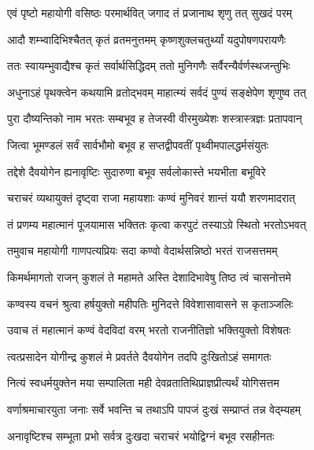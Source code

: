 
\twolineshloka
{एवं पृष्टो महायोगी वसिष्ठः परमार्थवित्}
{जगाद तं प्रजानाथ श‍ृणु तत् सुखदं परम्} %


\twolineshloka
{आदौ शम्भ्वादिभिश्चैतत् कृतं व्रतमनुत्तमम्}
{कृष्णशुक्लचतुर्थ्यां यदुपोषणपरायणैः} %

\twolineshloka
{ततः स्वायम्भुवाद्यैश्च कृतं सर्वार्थसिद्धिदम्}
{ततो मुनिगणैः सर्वैरन्यैर्वर्णस्थजन्तुभिः} %

\twolineshloka
{अधुनाऽहं पृथक्त्वेन कथयामि व्रतोद्भवम्}
{माहात्म्यं सर्वदं पुण्यं सङ्क्षेपेण श‍ृणुष्व तत्} %

\twolineshloka
{पुरा दौष्यन्तिको नाम भरतः सम्बभूव ह}
{तेजस्वी वीरमुख्येशः शस्त्रास्त्रज्ञः प्रतापवान्} %

\twolineshloka
{जित्वा भूमण्डलं सर्वं सार्वभौमो बभूव ह}
{सप्तद्वीपवतीं पृथ्वीमपालद्धर्मसंयुतः} %

\twolineshloka
{तद्देशे दैवयोगेन ह्यनावृष्टिः सुदारुणा}
{बभूव सर्वलोकास्ते भयभीता बभूविरे} %

\twolineshloka
{चराचरं व्यथायुक्तं दृष्ट्वा राजा महायशाः}
{कण्वं मुनिवरं शान्तं ययौ शरणमादरात्} %

\twolineshloka
{तं प्रणम्य महात्मानं पूजयामास भक्तितः}
{कृत्वा करपुटं तस्याऽग्रे स्थितो भरतोऽभवत्} %

\twolineshloka
{तमुवाच महायोगी गाणपत्यप्रियः सदा}
{कण्वो वेदार्थसन्निष्ठो भरतं राजसत्तमम्} %


\twolineshloka
{किमर्थमागतो राजन् कुशलं ते महामते}
{अस्ति देशादिभावेषु तिष्ठ त्वं चासनोत्तमे} %

\twolineshloka
{कण्वस्य वचनं श्रुत्वा हर्षयुक्तो महीपतिः}
{मुनिदत्ते विवेशासावासने स कृताञ्जलिः} %

\twolineshloka
{उवाच तं महात्मानं कण्वं वेदविदां वरम्}
{भरतो राजनीतिज्ञो भक्तियुक्तो विशेषतः} %


\twolineshloka
{त्वत्प्रसादेन योगीन्द्र कुशलं मे प्रवर्तते}
{दैवयोगेन तदपि दुःखितोऽहं समागतः} %

\twolineshloka
{नित्यं स्वधर्मयुक्तेन मया सम्पालिता मही}
{देवव्रतातिथिप्राज्ञप्रीत्यर्थं योगिसत्तम} %

\twolineshloka
{वर्णाश्रमाचारयुता जनाः सर्वे भवन्ति च}
{तथाऽपि पापजं दुःखं सम्प्राप्तं तन्न वेद्म्यहम्} %

\twolineshloka
{अनावृष्टिश्च सम्भूता प्रभो सर्वत्र दुःखदा}
{चराचरं भयोद्विग्नं बभूव रसहीनतः} %

